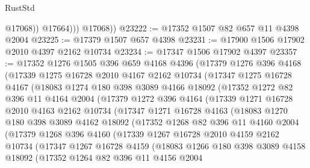 \begin{lexlean}{RustStd}
\begin{coremodule}
                  @17068))
              @17664)))
        @17068))
@23222 := @17352 @1507 @82 @657 @11 @4398 @2004
@23225 := @17379 @1507 @657 @4398
@23231 := @17900 @1506 @17902 @2010 @4397 @2162 @10734
@23234 := @17347 @1506 @17902 @4397
@23357 := @17352
    @1276
    @1505
    @396
    @659
    @4168
    @4396
    (@17379
      @1276
      @396
      @4168
      (@17339
        @1275
        @16728
        @2010
        @4167
        @2162
        @10734
        (@17347
          @1275
          @16728
          @4167
          (@18083
            @1274
            @180
            @398
            @3089
            @4166
            @18092
            (@17352
              @1272
              @82
              @396
              @11
              @4164
              @2004
              (@17379
                @1272
                @396
                @4164
                (@17339
                  @1271
                  @16728
                  @2010
                  @4163
                  @2162
                  @10734
                  (@17347
                    @1271
                    @16728
                    @4163
                    (@18083
                      @1270
                      @180
                      @398
                      @3089
                      @4162
                      @18092
                      (@17352
                        @1268
                        @82
                        @396
                        @11
                        @4160
                        @2004
                        (@17379
                          @1268
                          @396
                          @4160
                          (@17339
                            @1267
                            @16728
                            @2010
                            @4159
                            @2162
                            @10734
                            (@17347
                              @1267
                              @16728
                              @4159
                              (@18083
                                @1266
                                @180
                                @398
                                @3089
                                @4158
                                @18092
                                (@17352
                                  @1264
                                  @82
                                  @396
                                  @11
                                  @4156
                                  @2004

\end{coremodule}
\end{lexlean}
